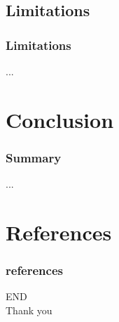 \documentclass[aspectratio=1610]{beamer}
\begin{document}
\subsection{Limitations}
\begin{frame}
\frametitle{Limitations}
...
\end{frame}

\section{Conclusion}
\begin{frame}
\frametitle{Summary}
...
\end{frame}

\section{References}
\begin{frame}
	\frametitle{references}
	\printbibliography
\end{frame}
\begin{frame}
  \centering
  \Huge{END\\Thank you}
\end{frame}
\end{document}
